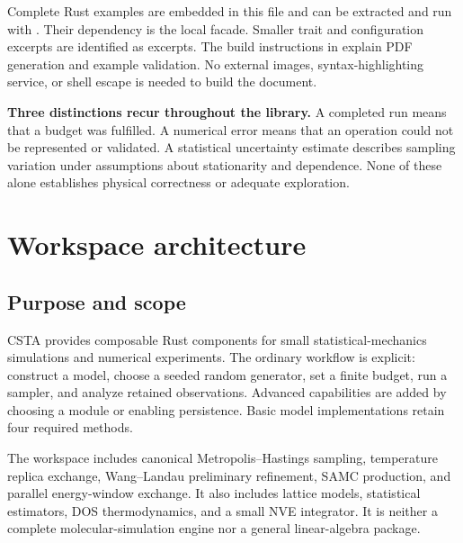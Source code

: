 \documentclass[11pt,a4paper,oneside]{report}
\newcommand{\api}[1]{\texttt{\detokenize{#1}}}
\begin{document}
Complete Rust examples are embedded in this file and can be extracted and run
with . Their dependency is the local \api{csta}
facade. Smaller trait and configuration excerpts are identified as excerpts.
The build instructions in  explain PDF generation and example
validation. No external images, syntax-highlighting service, or shell escape is
needed to build the document.

\textbf{Three distinctions recur throughout the library.} A completed run means
that a budget was fulfilled. A numerical error means that an operation could not
be represented or validated. A statistical uncertainty estimate describes
sampling variation under assumptions about stationarity and dependence. None of
these alone establishes physical correctness or adequate exploration.
\tableofcontents
\clearpage
{}

\chapter{Workspace architecture}\label{ch:architecture}
\section{Purpose and scope}
CSTA provides composable Rust components for small statistical-mechanics
simulations and numerical experiments. The ordinary workflow is explicit:
construct a model, choose a seeded random generator, set a finite budget, run a
sampler, and analyze retained observations. Advanced capabilities are added by
choosing a module or enabling persistence. Basic model implementations retain
four required \api{State} methods.

The workspace includes canonical Metropolis--Hastings sampling, temperature
replica exchange, Wang--Landau preliminary refinement, SAMC production, and
parallel energy-window exchange. It also includes lattice models, statistical
estimators, DOS thermodynamics, and a small NVE integrator. It is neither a
complete molecular-simulation engine nor a general linear-algebra package.
\end{document}
